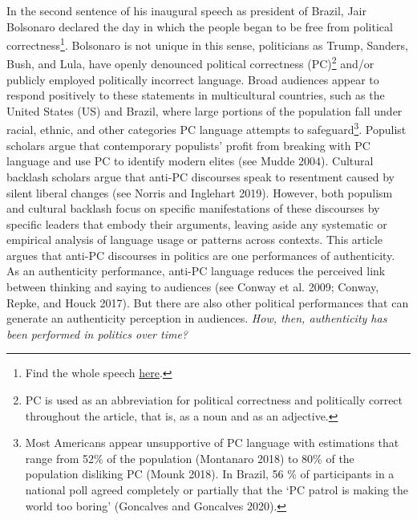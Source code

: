\documentclass[
  12pt,
]{article}
\begin{document}
In the second sentence of his inaugural speech as president of Brazil,
Jair Bolsonaro declared the day in which the people began to be free
from political correctness\footnote{ Find the whole speech
  \href{https://www.youtube.com/watch?v=5iPVlE_9kFw}{here}.}. Bolsonaro
is not unique in this sense, politicians as Trump, Sanders, Bush, and
Lula, have openly denounced political correctness (PC)\footnote{ PC is
  used as an abbreviation for political correctness and politically
  correct throughout the article, that is, as a noun and as an
  adjective.} and/or publicly employed politically incorrect language.
Broad audiences appear to respond positively to these statements in
multicultural countries, such as the United States (US) and Brazil,
where large portions of the population fall under racial, ethnic, and
other categories PC language attempts to safeguard\footnote{ Most
  Americans appear unsupportive of PC language with estimations that
  range from 52\% of the population (Montanaro 2018) to 80\% of the
  population disliking PC (Mounk 2018). In Brazil, 56 \% of participants
  in a national poll agreed completely or partially that the `PC patrol
  is making the world too boring' (Goncalves and Goncalves 2020).}.
Populist scholars argue that contemporary populists' profit from
breaking with PC language and use PC to identify modern elites (see
Mudde 2004). Cultural backlash scholars argue that anti-PC discourses
speak to resentment caused by silent liberal changes (see Norris and
Inglehart 2019). However, both populism and cultural backlash focus on
specific manifestations of these discourses by specific leaders that
embody their arguments, leaving aside any systematic or empirical
analysis of language usage or patterns across contexts. This article
argues that anti-PC discourses in politics are one performances of
authenticity. As an authenticity performance, anti-PC language reduces
the perceived link between thinking and saying to audiences (see Conway
et al. 2009; Conway, Repke, and Houck 2017). But there are also other
political performances that can generate an authenticity perception in
audiences. \emph{How, then, authenticity has been performed in politics
over time?}
\end{document}
